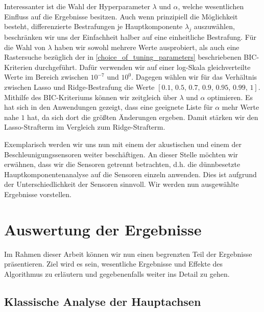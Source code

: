 Interessanter ist die Wahl der Hyperparameter $\lambda$ und $\alpha$, welche wesentlichen Einfluss auf die Ergebnisse besitzen. Auch wenn prinzipiell die Möglichkeit besteht, differenzierte Bestrafungen je Hauptkomponente $\lambda_j$ auszuwählen, beschränken wir uns der Einfachheit halber auf eine einheitliche Bestrafung. Für die Wahl von $\lambda$ haben wir sowohl mehrere Werte ausprobiert, als auch eine Rastersuche bezüglich der in \ref{choice_of_tuning_parameters} beschriebenen BIC-Kriterien durchgeführt. Dafür verwenden wir auf einer log-Skala gleichverteilte Werte im Bereich zwischen $10^{-7}$ und $10^0$. Dagegen wählen wir für das Verhältnis zwischen Lasso und Ridge-Bestrafung die Werte $[0.1,\, 0.5,\, 0.7,\, 0.9,\, 0.95,\, 0.99,\, 1]$. Mithilfe des BIC-Kriteriums können wir zeitgleich über $\lambda$ und $\alpha$ optimieren. Es hat sich in den Anwendungen gezeigt, dass eine geeignete Liste für $\alpha$ mehr Werte nahe $1$ hat, da sich dort die größten Änderungen ergeben. Damit stärken wir den Lasso-Strafterm im Vergleich zum Ridge-Strafterm.

Exemplarisch werden wir uns nun mit einem der akustischen und einem der Beschleunigungssensoren weiter beschäftigen. An dieser Stelle möchten wir erwähnen, dass wir die Sensoren getrennt betrachten, d.h. die dünnbesetzte Hauptkomponentenanalyse auf die Sensoren einzeln anwenden. Dies ist aufgrund der Unterschiedlichkeit der Sensoren sinnvoll. Wir werden nun ausgewählte Ergebnisse vorstellen. 




\section{Auswertung der Ergebnisse}
\label{evaluation}

Im Rahmen dieser Arbeit können wir nun einen begrenzten Teil der Ergebnisse präsentieren. Ziel wird es sein, wesentliche Ergebnisse und Effekte des Algorithmus zu erläutern und gegebenenfalls weiter ins Detail zu gehen. 




\subsection{Klassische Analyse der Hauptachsen}

